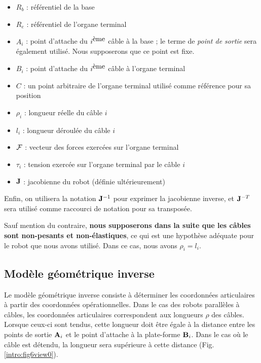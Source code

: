 \begin{itemize}
 \item $R_b$ : référentiel de la base
 \item $R_e$ : référentiel de l'organe terminal
 \item $A_i$ : point d'attache du $i^{\hbox{ème}}$ câble à la base ; le terme 
de {\it point de sortie} sera également utilisé. Nous supposerons que ce point 
est fixe.
 \item $B_i$ : point d'attache du $i^{\hbox{ème}}$ câble à l'organe terminal
 \item $C$ : un point arbitraire de l'organe terminal utilisé comme référence 
pour sa position
 \item $\rho_i$ : longueur réelle du câble $i$
 \item $l_i$ : longueur déroulée du câble $i$
 \item $\bf{\hbox{$\mathcal F$}}$ : vecteur des forces exercées sur l'organe 
terminal
  \item $\tau_i$ : tension exerc\'ee sur l'organe terminal par le c\^able $i$
 \item $\bf J$ : jacobienne du robot (d\'efinie ult\'erieurement)
\end{itemize}
Enfin, on utilisera la notation ${\bf J}^{-1}$ pour exprimer la jacobienne 
inverse, et ${\bf J}^{-T}$ sera utilisé comme raccourci de notation pour sa 
transposée.

Sauf mention du contraire, {\bf nous supposerons dans la suite que les câbles 
sont non-pesants et non-élastiques}, ce qui est une hypothèse adéquate pour le 
robot que nous avons utilisé. Dans ce cas, nous avons $\rho_i = l_i$.

\subsection{Modèle géométrique inverse} \label{chap0-2-1}

Le modèle géométrique inverse consiste à déterminer les coordonnées 
articulaires à partir des coordonnées opérationnelles. Dans le cas des robots 
parallèles à câbles, les coordonnées articulaires correspondent aux longueurs 
$\rho$ des câbles. Lorsque ceux-ci sont tendus, cette longueur doit être égale à 
la distance entre les points de sortie ${\bf A}_i$ et le point d'attache à la 
plate-forme ${\bf B}_i$. Dans le cas où le câble est détendu, la longueur sera 
supérieure à cette distance (Fig.\ref{intro:fig6view0}).\\

